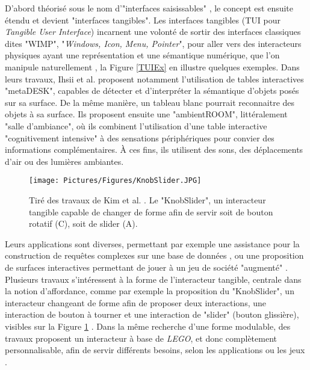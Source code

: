			D'abord théorisé sous le nom d'"interfaces saisissables" \cite{fitzmaurice_bricks_1995}, le concept est ensuite étendu et devient "interfaces tangibles". Les interfaces tangibles (TUI pour \textit{Tangible User Interface}) incarnent une volonté de sortir des interfaces classiques dites "WIMP", "\textit{Windows, Icon, Menu, Pointer}", pour aller vers des interacteurs physiques ayant une représentation et une sémantique numérique, que l'on manipule naturellement \cite{ishii_tangible_1997}, la Figure \ref{TUIEx} en illustre quelques exemples. Dans leurs travaux, Ihsii et al. \cite{ishii_tangible_1997} proposent notamment l'utilisation de tables interactives "metaDESK", capables de détecter et d'interpréter la sémantique d'objets posés sur sa surface. De la même manière, un tableau blanc pourrait reconnaitre des objets à sa surface. Ils proposent ensuite une "ambientROOM", littéralement "salle d'ambiance", où ils combinent l'utilisation d'une table interactive "cognitivement intensive" à des sensations périphériques pour convier des informations complémentaires. À ces fins, ils utilisent des sons, des déplacements d'air ou des lumières ambiantes.
			
			\begin{figure}
			\centering
			\texttt{[image: Pictures/Figures/KnobSlider.JPG]}
			\caption{Tiré des travaux de Kim et al. \cite{kim_knobslider_2019}. Le "KnobSlider", un interacteur tangible capable de changer de forme afin de servir soit de bouton rotatif (C), soit de slider (A).}
			\label{KnobSlider}
		\end{figure}
			
			Leurs applications sont diverses, permettant par exemple une assistance pour la construction de requêtes complexes sur une base de données \cite{pereda_tui_2019}, ou une proposition de surfaces interactives permettant de jouer à un jeu de société "augmenté" \cite{villar_project_2018}. Plusieurs travaux s'intéressent à la forme de l'interacteur tangible, centrale dans la notion d'affordance, comme par exemple la proposition du "KnobSlider", un interacteur changeant de forme afin de proposer deux interactions, une interaction de bouton à tourner et une interaction de "slider" (bouton glissière), visibles sur la Figure \ref{KnobSlider} \cite{kim_knobslider_2019}. Dans la même recherche d'une forme modulable, des travaux proposent un interacteur à base de \textit{LEGO}, et donc complètement personnalisable, afin de servir différents besoins, selon les applications ou les jeux \cite{arora_virtualbricks_2019}.
				
